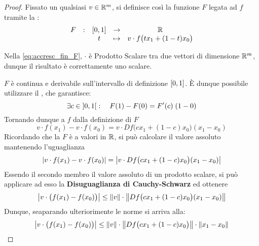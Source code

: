 \begin{theorem}
\begin{proof}
		Fissato un qualsiasi $v \in \mathbb{R}^m$, si definisce così la funzione $F$ legata ad $f$ tramite la :
		\begin{equation}
			\label{eq:accresc_fin_F}
			\begin{array}{ccccc} {F} & : & {\left[0,1\right]} & \to & {\mathbb{R}} \\ & & {t} & \mapsto & {v \cdot f \bigl( t x_1 + (1-t)x_0 \bigr)} \\ \end{array}
		\end{equation}
		\begin{note}
			Nella \cref{eq:accresc_fin_F},  $\cdot$  è Prodotto Scalare tra due vettori di dimensione $\mathbb{R}^m$, dunque il risultato è correttamente uno scalare.
		\end{note}
		$F$ è continua e derivabile sull'intervallo di definizione $\left[0,1\right]$. È dunque possibile utilizzare il , che garantisce:
		\[\exists c \in \left]0,1\right[: \quad F(1) - F(0) = F'(c) \; (1-0)\]
		Tornando dunque a $f$ dalla definizione di $F$
		\[v \cdot f(x_1) - v \cdot f(x_0) = v \cdot Df\bigl( cx_1 + (1-c)x_0 \bigr) (x_1 - x_0)\]
		Ricordando che la $F$ è a valori in $\mathbb{R}$, si può calcolare il valore assoluto mantenendo l'uguaglianza
		\[\left|v \cdot f(x_1) - v \cdot f(x_0)\right| = \left|v \cdot Df\bigl( cx_1 + (1-c)x_0 \bigr) (x_1 - x_0)\right|\]
		Essendo il secondo membro il valore assoluto di un prodotto scalare, si può applicare ad esso la \textbf{Disuguaglianza di Cauchy-Schwarz} ed ottenere
		\[\left|v \cdot \bigl( f(x_1) - f(x_0) \bigr)\right| \leq \left\|v\right\| \cdot \left\|Df\bigl( cx_1 + (1-c)x_0 \bigr) (x_1 - x_0)\right\|\]
		Dunque, seaparando ulteriorimente le norme si arriva alla:
		\begin{equation}
			\label{eq:accr_fin_norm}
			\left|v \cdot \bigl( f(x_1) - f(x_0) \bigr)\right| \leq \left\|v\right\| \cdot \left\|Df\bigl( cx_1 + (1-c)x_0 \bigr)\right\| \cdot \left\|x_1 - x_0\right\|
		\end{equation}


\end{proof}
\end{theorem}
